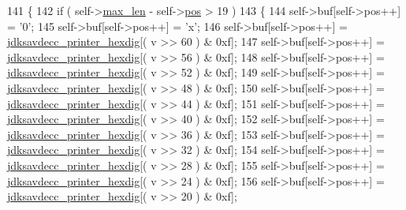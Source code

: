\begin{DoxyCode}
141 \{
142     \textcolor{keywordflow}{if} ( self->\hyperlink{structjdksavdecc__printer_a956cb5a3c4322e6d67c2f2b21077716c}{max\_len} - self->\hyperlink{structjdksavdecc__printer_a5438a597ee291f523ae04a9fe355924f}{pos} > 19 )
143     \{
144         \textcolor{keyword}{self}->buf[\textcolor{keyword}{self}->pos++] = \textcolor{charliteral}{'0'};
145         \textcolor{keyword}{self}->buf[\textcolor{keyword}{self}->pos++] = \textcolor{charliteral}{'x'};
146         \textcolor{keyword}{self}->buf[\textcolor{keyword}{self}->pos++] = \hyperlink{jdksavdecc__print_8c_ad23c15dfac839a83ff16748e1737ba80}{jdksavdecc\_printer\_hexdig}[( v >> 60 ) & 0xf];
147         \textcolor{keyword}{self}->buf[\textcolor{keyword}{self}->pos++] = \hyperlink{jdksavdecc__print_8c_ad23c15dfac839a83ff16748e1737ba80}{jdksavdecc\_printer\_hexdig}[( v >> 56 ) & 0xf];
148         \textcolor{keyword}{self}->buf[\textcolor{keyword}{self}->pos++] = \hyperlink{jdksavdecc__print_8c_ad23c15dfac839a83ff16748e1737ba80}{jdksavdecc\_printer\_hexdig}[( v >> 52 ) & 0xf];
149         \textcolor{keyword}{self}->buf[\textcolor{keyword}{self}->pos++] = \hyperlink{jdksavdecc__print_8c_ad23c15dfac839a83ff16748e1737ba80}{jdksavdecc\_printer\_hexdig}[( v >> 48 ) & 0xf];
150         \textcolor{keyword}{self}->buf[\textcolor{keyword}{self}->pos++] = \hyperlink{jdksavdecc__print_8c_ad23c15dfac839a83ff16748e1737ba80}{jdksavdecc\_printer\_hexdig}[( v >> 44 ) & 0xf];
151         \textcolor{keyword}{self}->buf[\textcolor{keyword}{self}->pos++] = \hyperlink{jdksavdecc__print_8c_ad23c15dfac839a83ff16748e1737ba80}{jdksavdecc\_printer\_hexdig}[( v >> 40 ) & 0xf];
152         \textcolor{keyword}{self}->buf[\textcolor{keyword}{self}->pos++] = \hyperlink{jdksavdecc__print_8c_ad23c15dfac839a83ff16748e1737ba80}{jdksavdecc\_printer\_hexdig}[( v >> 36 ) & 0xf];
153         \textcolor{keyword}{self}->buf[\textcolor{keyword}{self}->pos++] = \hyperlink{jdksavdecc__print_8c_ad23c15dfac839a83ff16748e1737ba80}{jdksavdecc\_printer\_hexdig}[( v >> 32 ) & 0xf];
154         \textcolor{keyword}{self}->buf[\textcolor{keyword}{self}->pos++] = \hyperlink{jdksavdecc__print_8c_ad23c15dfac839a83ff16748e1737ba80}{jdksavdecc\_printer\_hexdig}[( v >> 28 ) & 0xf];
155         \textcolor{keyword}{self}->buf[\textcolor{keyword}{self}->pos++] = \hyperlink{jdksavdecc__print_8c_ad23c15dfac839a83ff16748e1737ba80}{jdksavdecc\_printer\_hexdig}[( v >> 24 ) & 0xf];
156         \textcolor{keyword}{self}->buf[\textcolor{keyword}{self}->pos++] = \hyperlink{jdksavdecc__print_8c_ad23c15dfac839a83ff16748e1737ba80}{jdksavdecc\_printer\_hexdig}[( v >> 20 ) & 0xf];

\end{DoxyCode}
